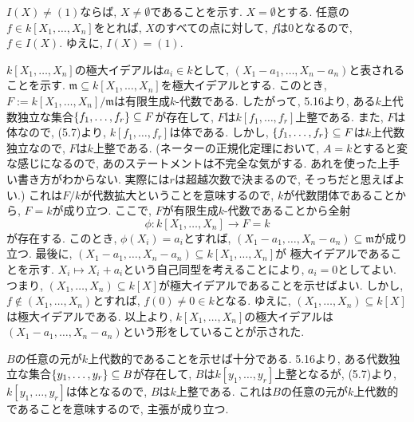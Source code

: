 \documentclass[dvipdfmx]{jsarticle}
\begin{document}
    \begin{problem}
        $I(X) \neq (1)$ならば, $X \neq \emptyset$であることを示す.
        $X = \emptyset$とする.
        任意の$f \in k[X_1, \dots, X_n]$をとれば,
        $X$のすべての点に対して, $f$は$0$となるので, $f \in I(X)$.
        ゆえに, $I(X) = (1)$.

        $k[X_1, \dots, X_n]$の極大イデアルは$a_i \in k$として,
        $(X_1 -a_1, \dots, X_n - a_n)$と表されることを示す.
        $\mathfrak{m} \subseteq k[X_1, \dots, X_n]$を極大イデアルとする.
        このとき, $F := k[X_1, \dots, X_n]/\mathfrak{m}$は有限生成$k$-代数である.
        したがって, 5.16より,
        ある$k$上代数独立な集合$\{f_1, \dots, f_r\} \subseteq F$が存在して,
        $F$は$k[f_1, \dots, f_r]$上整である.
        また, $F$は体なので, (5.7)より, $k[f_1, \dots, f_r]$は体である.
        しかし, $\{f_1, \dots, f_r\} \subseteq F$は$k$上代数独立なので,
        $F$は$k$上整である.
        \color{red}
        (ネーターの正規化定理において, $A = k$とすると変な感じになるので, あのステートメントは不完全な気がする.
        あれを使った上手い書き方がわからない.
        実際には$r$は超越次数で決まるので, そっちだと思えばよい.)
        \color{black}
        これは$F/k$が代数拡大ということを意味するので, $k$が代数閉体であることから,
        $F = k$が成り立つ.
        ここで, $F$が有限生成$k$-代数であることから全射
        \[
            \phi: k[X_1, \dots, X_n] \longrightarrow F = k
        \]
        が存在する.
        このとき,
        $\phi(X_i) = a_i$とすれば, $(X_1-a_1, \dots, X_n - a_n) \subseteq \mathfrak{m}$が成り立つ.
        最後に, $(X_1 - a_1, \dots,X_n - a_n) \subseteq k[X_1, \dots, X_n]$が
        極大イデアルであることを示す.
        $X_i \mapsto X_i + a_i$という自己同型を考えることにより, $a_i = 0$としてよい.
        つまり, $(X_1, \dots, X_n) \subseteq k[X]$が極大イデアルであることを示せばよい.
        しかし, $f \notin (X_1, \dots, X_n)$とすれば, $f(0) \neq 0 \in k$となる.
        ゆえに, $(X_1, \dots, X_n) \subseteq k[X]$は極大イデアルである.
        以上より, $k[X_1, \dots, X_n]$の極大イデアルは$(X_1 -a_1, \dots, X_n-a_n)$という形をしていることが示された.
    \end{problem}

    \begin{problem}
        $B$の任意の元が$k$上代数的であることを示せば十分である.
        5.16より, ある代数独立な集合$\{y_1, \dots, y_r\} \subseteq B$が存在して,
        $B$は$k[y_1, \dots, y_r]$上整となるが,
        (5.7)より, $k[y_1, \dots, y_r]$は体となるので,  $B$は$k$上整である.
        これは$B$の任意の元が$k$上代数的であることを意味するので, 主張が成り立つ.
    \end{problem}
\end{document}
